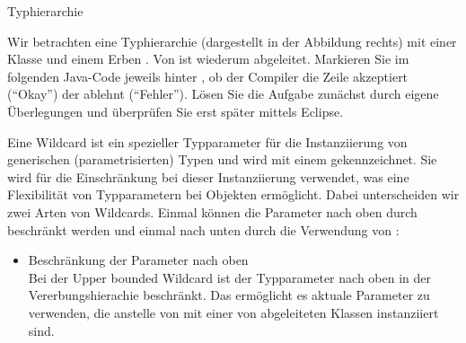 \documentclass{../tuda-exercise}
\begin{document}
  \begin{task}[credit=\stars{2}{3}]{Typhierarchie}
    \begin{minipage}{0.7\textwidth}
      Wir betrachten eine Typhierarchie (dargestellt in der Abbildung rechts) mit einer Klasse
       und einem Erben . Von  ist wiederum
       abgeleitet. Markieren Sie im folgenden Java-Code jeweils hinter
      \inlinejava{//}, ob der Compiler die Zeile akzeptiert (\enquote{Okay}) der ablehnt
      (\enquote{Fehler}). Lösen Sie die Aufgabe zunächst durch eigene Überlegungen und überprüfen
      Sie erst später mittels Eclipse.
    \end{minipage}
    \hfill
    \begin{minipage}{0.2\textwidth}
    \end{minipage}

    

    \clearpagesolution

    \begin{solution}
      

      \begin{note}[title=Information:]
        Eine Wildcard ist ein spezieller Typparameter für die Instanziierung von generischen
        (parametrisierten) Typen und wird mit einem  gekennzeichnet. Sie wird für
        die Einschränkung bei dieser Instanziierung verwendet, was eine Flexibilität von
        Typparametern bei Objekten ermöglicht. Dabei unterscheiden wir zwei Arten von Wildcards.
        Einmal können die Parameter nach oben durch  beschränkt werden und
        einmal nach unten durch die Verwendung von :

        \begin{itemize}
          \item Beschränkung der Parameter nach oben
          \\
          Bei der Upper bounded Wildcard ist der Typparameter nach oben in der
          Vererbungshierachie beschränkt. Das ermöglicht es aktuale Parameter zu verwenden, die
          anstelle von  mit einer von  abgeleiteten Klassen
          instanziiert sind.


\end{itemize}
\end{note}
\end{solution}
\end{task}
\end{document}
